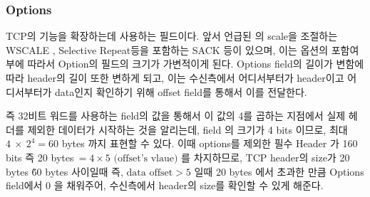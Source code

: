     \subsubsection*{Options}
        TCP의 기능을 확장하는데  사용하는 필드이다. 앞서 언급된 의 scale을 조절하는 WSCALE , Selective Repeat등을 포함하는 SACK 등이 있으며, 이는 옵션의 포함여부에 따라서 Option의 필드의 크기가 가변적이게 된다. 
        Options field의 길이가 변함에따라 header의 길이 또한 변하게 되고, 이는 수신측에서 어디서부터가 header이고 어디서부터가 data인지 확인하기 위해 offset field를 통해서 이를 전달한다. 
        
        즉 32비트 워드를 사용하는  field의 값을 통해서 이 값의 4를 곱하는 지점에서 실제 헤더를 제외한 데이터가 시작하는 것을 알리는데,  field 의 크기가 4 bits 이므로,  최대 $4\ \times\ 2^4 = 60$ bytes 까지 표현할 수 있다. 
        이때 options를 제외한 필수 Header 가 160 bits 즉 20 bytes$\ = 4 \times 5 \text{ (offset's vlaue)}$ 를 차지하므로, TCP header의 size가 20 bytes \~ 60 bytes 사이일때 즉, $\text{data offset} > 5$ 일때 20 bytes 에서 초과한 만큼 Options field에서 0 을 채워주어, 수신측에서 header의 size를 확인할 수 있게 해준다.